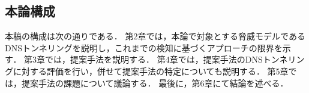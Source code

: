 



\subsection{本論構成}
本稿の構成は次の通りである．
第2章では，本論で対象とする脅威モデルであるDNSトンネリングを説明し，これまでの検知に基づくアプローチの限界を示す．
第3章では，提案手法を説明する．
第4章では，提案手法のDNSトンネリングに対する評価を行い，併せて提案手法の特定についても説明する．
第5章では，提案手法の課題について議論する．
最後に，第6章にて結論を述べる．
